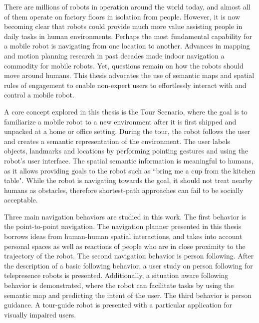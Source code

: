 \begin{summary}

There are millions of robots in operation around the world today, and almost all of them operate on factory floors in isolation from people. However, it is now becoming clear that robots could provide much more value assisting people in daily tasks in human environments. Perhaps the most fundamental capability for a mobile robot is navigating from one location to another. Advances in mapping and motion planning research in past decades made indoor navigation a commodity for mobile robots. Yet, questions remain on how the robots should move around humans. This thesis advocates the use of semantic maps and spatial rules of engagement to enable non-expert users to effortlessly interact with and control a mobile robot.

A core concept explored in this thesis is the Tour Scenario, where the goal is to familiarize a mobile robot to a new environment after it is first shipped and unpacked at a home or office setting. During the tour, the robot follows the user and creates a semantic representation of the environment. The user labels objects, landmarks and locations by performing pointing gestures and using the robot's user interface. The spatial semantic information is meaningful to humans, as it allows providing goals to the robot such as ``bring me a cup from the kitchen table". While the robot is navigating towards the goal, it should not treat nearby humans as obstacles, therefore shortest-path approaches can fail to be socially acceptable.

Three main navigation behaviors are studied in this work. The first behavior is the point-to-point navigation. The navigation planner presented in this thesis borrows ideas from human-human spatial interactions, and takes into account personal spaces as well as reactions of people who are in close proximity to the trajectory of the robot. The second navigation behavior is person following. After the description of a basic following behavior, a user study on person following for telepresence robots is presented. Additionally, a situation aware following behavior is demonstrated, where the robot can facilitate tasks by using the semantic map and predicting the intent of the user. The third behavior is person guidance. A tour-guide robot is presented with a particular application for visually impaired users.

\end{summary}